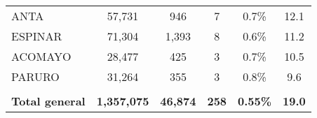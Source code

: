\begin{tabular}{lccccc}
	\cellcolor[HTML]{FFFF99}ANTA                                    & 57,731               & 946                                  & 7                    & 0.7\%                      & 12.1                                        \\
	\cellcolor[HTML]{FFFF99}ESPINAR                                 & 71,304               & 1,393                                & 8                    & 0.6\%                      & 11.2                                        \\
	\cellcolor[HTML]{FFFF99}ACOMAYO                                 & 28,477               & 425                                  & 3                    & 0.7\%                      & 10.5                                        \\
	\cellcolor[HTML]{FFFF99}PARURO                                  & 31,264               & 355                                  & 3                    & 0.8\%                      & 9.6                                         \\
	& \multicolumn{1}{l}{} & \multicolumn{1}{l}{}                 & \multicolumn{1}{l}{} & \multicolumn{1}{l}{}       & \multicolumn{1}{l}{}                        \\
	\rowcolor[HTML]{DDEBF7} 
	\textbf{Total general}                                          & \textbf{1,357,075}   & \textbf{46,874}                      & \textbf{258}         & \textbf{0.55\%}            & \textbf{19.0}                              
\end{tabular}
